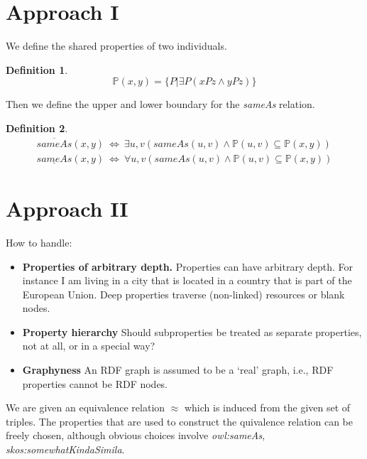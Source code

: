 \documentclass[11pt,a4paper,notitlepage,onecolumn,twoside]{article}
\newtheorem{definition}{Definition}
\begin{document}
\section{Approach I}

We define the shared properties of two individuals.

\begin{definition}
\begin{equation}
\mathbb{P}(x,y) = \{ P \vert \exists P (xPz \land yPz) \}
\end{equation}
\end{definition}

Then we define the upper and lower boundary for the \emph{sameAs} relation.

\begin{definition}
\begin{align}
\overline{sameAs}(x,y) \  \iff \  \exists u,v (sameAs(u,v) \land
    \mathbb{P}(u,v) \subseteq \mathbb{P}(x,y)) \\
\underline{sameAs}(x,y) \  \iff \  \forall u,v (sameAs(u,v) \land
    \mathbb{P}(u,v) \subseteq \mathbb{P}(x,y))
\end{align}
\end{definition}

\section{Approach II}

How to handle:
\begin{itemize}
\item \textbf{Properties of arbitrary depth.} Properties can have arbitrary
      depth. For instance I am living in a city that is located in a country
      that is part of the European Union. Deep properties traverse
      (non-linked) resources or blank nodes.
\item \textbf{Property hierarchy} Should subproperties be treated
      as separate properties, not at all, or in a special way?
\item \textbf{Graphyness} An RDF graph is assumed to be a `real' graph,
      i.e., RDF properties cannot be RDF nodes.
\end{itemize}

We are given an equivalence relation $\approx$ which is induced
from the given set of triples. The properties that are used to construct
the quivalence relation can be freely chosen, although obvious choices
involve \emph{owl:sameAs}, \emph{skos:somewhatKindaSimila}.
\end{document}
